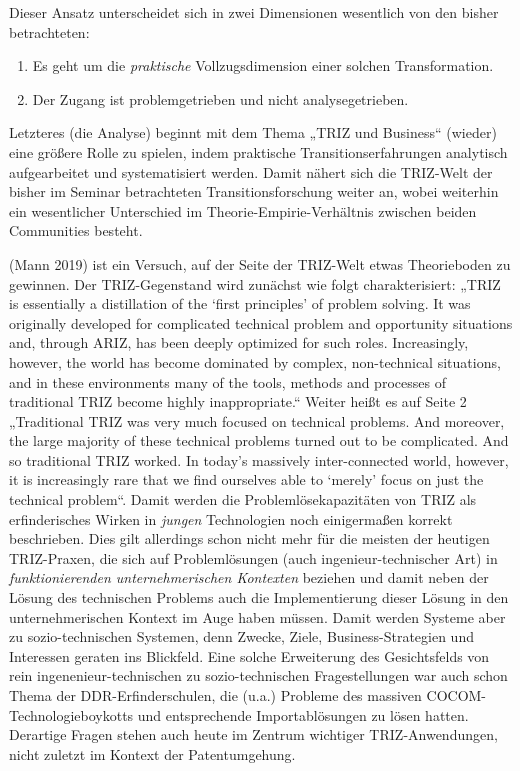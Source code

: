 \documentclass[11pt,a4paper]{article}
\begin{document}
Dieser Ansatz unterscheidet sich in zwei Dimensionen wesentlich von den bisher
betrachteten:
\begin{enumerate}[noitemsep]
\item Es geht um die \emph{praktische} Vollzugsdimension einer solchen
  Transformation.
\item Der Zugang ist problemgetrieben und nicht analysegetrieben.
\end{enumerate}

Letzteres (die Analyse) beginnt mit dem Thema „TRIZ und Business“ (wieder)
eine größere Rolle zu spielen, indem praktische Transitionserfahrungen
analytisch aufgearbeitet und systematisiert werden. Damit nähert sich die
TRIZ-Welt der bisher im Seminar betrachteten Transitionsforschung weiter an,
wobei weiterhin ein wesentlicher Unterschied im Theorie-Empirie-Verhältnis
zwischen beiden Communities besteht.

(Mann 2019) ist ein Versuch, auf der Seite der TRIZ-Welt etwas Theorieboden zu
gewinnen. Der TRIZ-Gegenstand wird zunächst wie folgt charakterisiert: „TRIZ
is essentially a distillation of the `first principles' of problem solving. It
was originally developed for complicated technical problem and opportunity
situations and, through ARIZ, has been deeply optimized for such
roles. Increasingly, however, the world has become dominated by complex,
non-technical situations, and in these environments many of the tools, methods
and processes of traditional TRIZ become highly inappropriate.“ Weiter heißt
es auf Seite 2 „Traditional TRIZ was very much focused on technical problems.
And moreover, the large majority of these technical problems turned out to be
complicated. And so traditional TRIZ worked. In today's massively
inter-connected world, however, it is increasingly rare that we find ourselves
able to `merely' focus on just the technical problem“. Damit werden die
Problemlösekapazitäten von TRIZ als erfinderisches Wirken in \emph{jungen}
Technologien noch einigermaßen korrekt beschrieben. Dies gilt allerdings schon
nicht mehr für die meisten der heutigen TRIZ-Praxen, die sich auf
Problemlösungen (auch ingenieur-technischer Art) in \emph{funktionierenden
  unternehmerischen Kontexten} beziehen und damit neben der Lösung des
technischen Problems auch die Implementierung dieser Lösung in den
unternehmerischen Kontext im Auge haben müssen.  Damit werden Systeme aber zu
sozio-technischen Systemen, denn Zwecke, Ziele, Business-Strategien und
Interessen geraten ins Blickfeld. Eine solche Erweiterung des Gesichtsfelds
von rein ingenenieur-technischen zu sozio-technischen Fragestellungen war auch
schon Thema der DDR-Erfinderschulen, die (u.a.) Probleme des massiven
COCOM-Technologieboykotts und entsprechende Importablösungen zu lösen
hatten. Derartige Fragen stehen auch heute im Zentrum wichtiger
TRIZ-Anwendungen, nicht zuletzt im Kontext der Patentumgehung.
\end{document}
